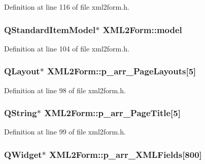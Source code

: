 Definition at line 116 of file xml2form.h.

\hypertarget{classXML2Form_af3d7959ecccc1032081211b0681fea50}{
\subsubsection[{model}]{\setlength{\rightskip}{0pt plus 5cm}QStandardItemModel$\ast$ {\bf XML2Form::model}}}
\label{classXML2Form_af3d7959ecccc1032081211b0681fea50}


Definition at line 104 of file xml2form.h.

\hypertarget{classXML2Form_a3f1e41e202d65c9bf760c03aa7b3e440}{
\subsubsection[{p\_\-arr\_\-PageLayouts}]{\setlength{\rightskip}{0pt plus 5cm}QLayout$\ast$ {\bf XML2Form::p\_\-arr\_\-PageLayouts}\mbox{[}5\mbox{]}}}
\label{classXML2Form_a3f1e41e202d65c9bf760c03aa7b3e440}


Definition at line 98 of file xml2form.h.

\hypertarget{classXML2Form_af9e35a7f57bce3c06e15b1ded76f5155}{
\subsubsection[{p\_\-arr\_\-PageTitle}]{\setlength{\rightskip}{0pt plus 5cm}QString$\ast$ {\bf XML2Form::p\_\-arr\_\-PageTitle}\mbox{[}5\mbox{]}}}
\label{classXML2Form_af9e35a7f57bce3c06e15b1ded76f5155}


Definition at line 99 of file xml2form.h.

\hypertarget{classXML2Form_abfb6a1adcacc676da34e9bafa8f2eb39}{
\subsubsection[{p\_\-arr\_\-XMLFields}]{\setlength{\rightskip}{0pt plus 5cm}QWidget$\ast$ {\bf XML2Form::p\_\-arr\_\-XMLFields}\mbox{[}800\mbox{]}}}
\label{classXML2Form_abfb6a1adcacc676da34e9bafa8f2eb39}


